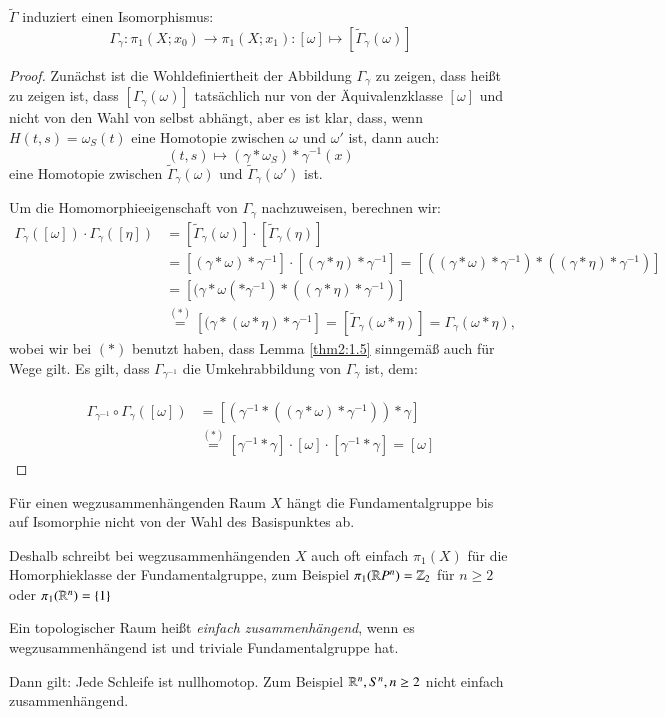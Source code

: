 \documentclass[a4paper,10pt]{scrartcl}
\begin{document}
\begin{st}\label{thm2:1.15}
 $\tilde \Gamma$ induziert einen Isomorphismus:
\[
 \Gamma_\gamma: \pi_1(X;x_0)\to \pi_1(X;x_1): [\omega] \mapsto [\tilde \Gamma_{\gamma}(\omega)]
\]
\end{st}
\begin{proof}
 Zunächst ist die Wohldefiniertheit der Abbildung $\Gamma_\gamma$ zu zeigen, dass heißt zu zeigen ist, dass $[\Gamma_{\gamma} (\omega)]$ tatsächlich nur von der Äquivalenzklasse $[\omega]$ und nicht von den Wahl von selbst abhängt, aber es ist klar, dass, wenn $H(t,s)=\omega_S(t)$ eine Homotopie zwischen $\omega$ und $\omega'$ ist, dann auch:
\[
 (t,s)\mapsto (\gamma*\omega_S)*\gamma^{-1}(x)
\]
eine Homotopie zwischen $\tilde \Gamma_{\gamma}(\omega)$ und $\tilde \Gamma_{\gamma}(\omega')$ ist. 

Um die Homomorphieeigenschaft von $\Gamma_{\gamma}$ nachzuweisen, berechnen wir: 
\begin{align*}
 \Gamma_{\gamma}([\omega])\cdot \Gamma_{\gamma} ([\eta])&=[\tilde \Gamma_{\gamma}(\omega)]\cdot [ \tilde \Gamma_{\gamma}(\eta)]\\
&=[(\gamma*\omega)*\gamma^{-1}]\cdot [(\gamma*\eta)*\gamma^{-1}]=[((\gamma*\omega)*\gamma^{-1})*((\gamma*\eta)*\gamma^{-1})]\\
&=[(\gamma*\omega(*\gamma^{-1})*((\gamma*\eta)*\gamma^{-1})]\\
&\stackrel{(*)}=[(\gamma*(\omega*\eta)*\gamma^{-1}]=[\tilde \Gamma_\gamma (\omega*\eta)]=\Gamma_\gamma(\omega*\eta),
\end{align*}
wobei wir bei $(*)$ benutzt haben, dass Lemma \ref{thm2:1.5} sinngemäß auch für Wege gilt. Es gilt, dass $\Gamma_{\gamma^{-1}}$ die Umkehrabbildung von $\Gamma_\gamma$ ist, dem:\\
\fixme[fig67]\\
\begin{align*}
 \Gamma_{\gamma^{-1}}\circ \Gamma_\gamma ([\omega])&=[(\gamma^{-1}*((\gamma*\omega)*\gamma^{-1}))*\gamma]\\
 &\stackrel{(*)}=[\gamma^{-1}*\gamma]\cdot [\omega]\cdot [\gamma^{-1} * \gamma]=[\omega]
\end{align*}
\end{proof}
\begin{kor}\label{thm2:1.16}
 Für einen wegzusammenhängenden Raum $X$ hängt die Fundamentalgruppe bis auf Isomorphie nicht von der Wahl des Basispunktes ab.

Deshalb schreibt bei wegzusammenhängenden $X$ auch oft einfach $\pi_1(X)$ für die Homorphieklasse der Fundamentalgruppe, zum Beispiel $\pi_1(\mathbb{R} P^n)=\mathbb{Z}_2$ für $n\ge 2$ oder $\pi_1(\mathbb{R}^n)=\{1\}$
\end{kor}
\begin{df}
 Ein topologischer Raum heißt \emph{einfach zusammenhängend}, wenn es wegzusammenhängend ist und triviale Fundamentalgruppe hat.

Dann gilt: Jede Schleife ist nullhomotop. Zum Beispiel $\mathbb{R}^n, S^n, n\ge 2$ nicht einfach zusammenhängend.  
\end{df}
\end{document}
